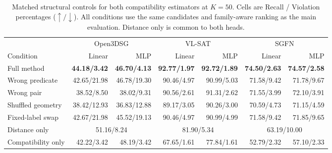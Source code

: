 \begin{table}[t]
\centering
{\small
\setlength{\tabcolsep}{2.8pt}
\begin{tabular}{@{}lrrrrrr@{}}
\toprule
& \multicolumn{2}{c}{Open3DSG} & \multicolumn{2}{c}{VL-SAT} & \multicolumn{2}{c}{SGFN} \\
\cmidrule(lr){2-3}\cmidrule(lr){4-5}\cmidrule(lr){6-7}
Condition & Linear & MLP & Linear & MLP & Linear & MLP \\
\midrule
Full method & \textbf{44.18/3.42} & \textbf{46.70/4.13} & \textbf{92.77/1.97} & \textbf{92.72/1.89} & \textbf{74.50/2.63} & \textbf{74.57/2.58} \\
Wrong predicate & 42.65/21.98 & 46.78/19.30 & 90.46/4.97 & 90.99/5.03 & 71.58/9.42 & 71.78/9.67 \\
Wrong pair & 38.52/8.50 & 38.02/9.31 & 90.56/2.61 & 91.31/2.62 & 71.55/3.99 & 72.10/3.91 \\
Shuffled geometry & 38.42/12.93 & 36.83/12.88 & 89.17/3.05 & 90.26/3.00 & 70.59/4.73 & 71.15/4.59 \\
Fixed-label swap & 42.67/21.98 & 45.52/19.13 & 90.46/4.97 & 90.99/4.99 & 71.58/9.42 & 71.85/9.65 \\
Distance only & \multicolumn{2}{c}{51.16/8.24} & \multicolumn{2}{c}{81.90/5.34} & \multicolumn{2}{c}{63.19/10.00} \\
Compatibility only & 42.22/3.42 & 48.19/3.42 & 67.65/1.61 & 77.84/1.61 & 52.79/2.32 & 57.10/2.33 \\
\bottomrule
\end{tabular}
}
\caption{Matched structural controls for both compatibility estimators at
$K=50$. Cells are Recall / Violation percentages ($\uparrow/\downarrow$).
All conditions use the same candidates and family-aware ranking as the main
evaluation. Distance only is common to both heads.}
\label{tab:ablations-k50}
\end{table}
